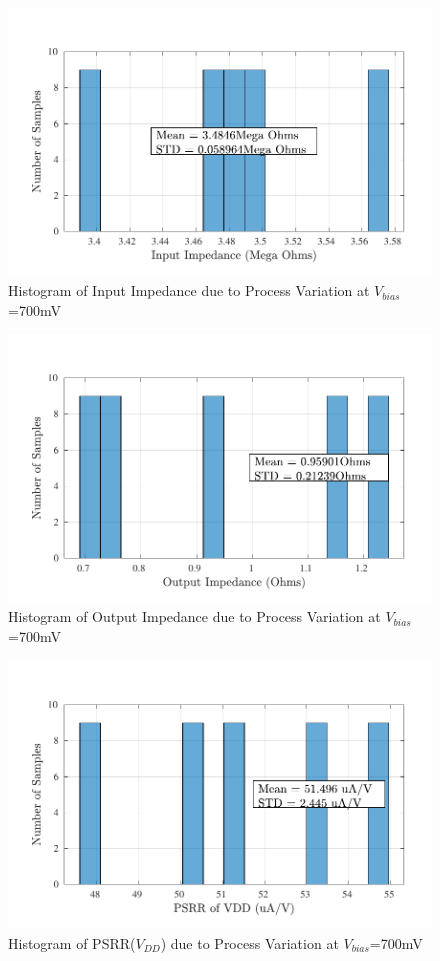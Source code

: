 \begin{figure} [H]
\centering
\includegraphics[scale=1]{Figures/Corners/Overall/Proc_Max/PDFs/Proc_Max_zin.pdf}
\caption{Histogram of Input Impedance due to Process Variation at $V_{bias}$=700mV}
\end{figure}

\begin{figure} [H]
\centering
\includegraphics[scale=1]{Figures/Corners/Overall/Proc_Max/PDFs/Proc_Max_zout.pdf}
\caption{Histogram of Output Impedance due to Process Variation at $V_{bias}$=700mV}
\end{figure}

\begin{figure} [H]
\centering
\includegraphics[scale=1]{Figures/Corners/Overall/Proc_Max/PDFs/Proc_Max_psrrp.pdf}
\caption{Histogram of PSRR($V_{DD}$) due to Process Variation at $V_{bias}$=700mV}
\end{figure}


